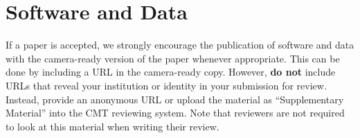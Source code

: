 \section*{Software and Data}

If a paper is accepted, we strongly encourage the publication of software and data with the
camera-ready version of the paper whenever appropriate. This can be
done by including a URL in the camera-ready copy. However, \textbf{do not}
include URLs that reveal your institution or identity in your
submission for review. Instead, provide an anonymous URL or upload
the material as ``Supplementary Material'' into the CMT reviewing
system. Note that reviewers are not required to look at this material
when writing their review.